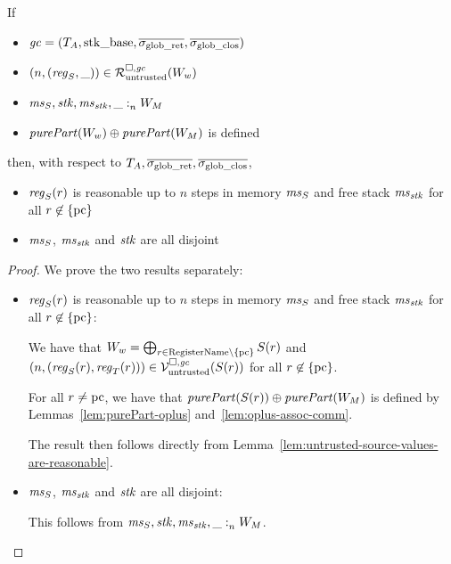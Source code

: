 \documentclass[a4paper]{article}
\begin{document}
\begin{lemma}
  If
  \begin{itemize}
  \item $\mathit{gc} = (T_{A},\mathrm{stk\_base},\overline{\sigma_{\mathrm{glob\_ret}}},\overline{\sigma_{\mathrm{glob\_clos}}})$
  \item $\npair{(\reg_S,\_)} \in \lrr(W_w)$
  \item $\mathit{ms}_S,\mathit{stk},\mathit{ms}_{\mathit{stk}},\_ :_{n}^{}W_M$
  \item $\purePart{W_w} \oplus \purePart{W_M}$ is defined
  \end{itemize}
  then, with respect to $T_{A},\overline{\sigma_{\mathrm{glob\_ret}}},\overline{\sigma_{\mathrm{glob\_clos}}}$,
  \begin{itemize}
  \item $\reg_S(r)$ is reasonable up to $n$ steps in memory $\mathit{ms}_S$ and free stack $\mathit{ms}_{\mathit{stk}}$ for all $r \not\in \{\mathrm{pc}\}$
  \item $\mathit{ms}_S$, $\mathit{ms}_{\mathit{stk}}$ and $\mathit{stk}$ are all disjoint
  \end{itemize}
\end{lemma}
\begin{proof}
  We prove the two results separately:
  \begin{itemize}
  \item $\reg_S(r)$ is reasonable up to $n$ steps in memory $\mathit{ms}_S$ and free stack $\mathit{ms}_{\mathit{stk}}$ for all $r \not\in \{\mathrm{pc}\}$:

    We have that $W_w = \bigoplus_{r \in \mathrm{RegisterName} \setminus \{\mathrm{pc}\}} S(r)$ and $\npair{(\reg_S(r),\reg_T(r))} \in \lrv(S(r))$ for all $r \not\in \{\mathrm{pc}\}$.

    For all $r \neq \mathrm{pc}$, we have that $\purePart{S(r)} \oplus \purePart{W_M}$ is defined by Lemmas~\ref{lem:purePart-oplus} and~\ref{lem:oplus-assoc-comm}.

    The result then follows directly from Lemma~\ref{lem:untrusted-source-values-are-reasonable}.

  \item $\mathit{ms}_S$, $\mathit{ms}_{\mathit{stk}}$ and $\mathit{stk}$ are all disjoint:
    
    This follows from $\mathit{ms}_S,\mathit{stk},\mathit{ms}_{\mathit{stk}},\_ :_{n}^{}W_M$.
  \end{itemize}
\end{proof}
\end{document}
